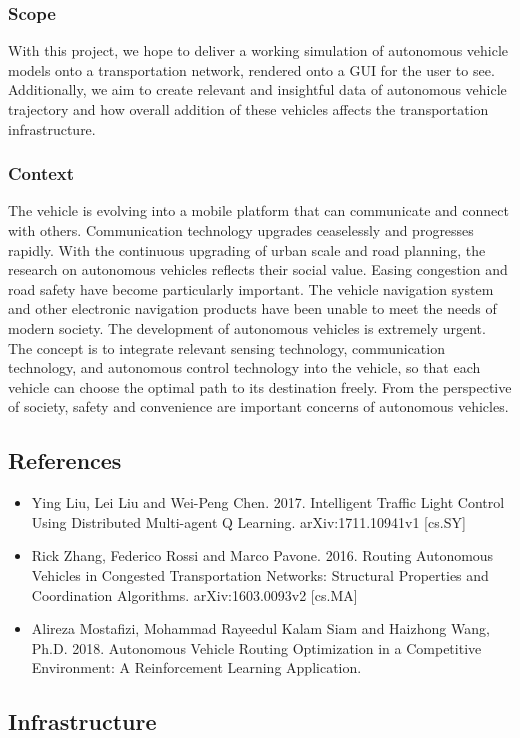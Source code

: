 \documentclass[onecolumn, draftclsnofoot,10pt, compsoc]{IEEEtran}
\begin{document}
\subsubsection{Scope}
With this project, we hope to deliver a working simulation of autonomous vehicle models onto a transportation network, rendered onto a GUI for the user to see.
Additionally, we aim to create relevant and insightful data of autonomous vehicle trajectory and how overall addition of these vehicles affects the transportation infrastructure.
\subsubsection{Context}
The vehicle is evolving into a mobile platform that can communicate and connect with others.
Communication technology upgrades ceaselessly and progresses rapidly.
With the continuous upgrading of urban scale and road planning, the research on autonomous vehicles reflects their social value.
Easing congestion and road safety have become particularly important.
The vehicle navigation system and other electronic navigation products have been unable to meet the needs of modern society.
The development of autonomous vehicles is extremely urgent.
The concept is to integrate relevant sensing technology, communication technology, and autonomous control technology into the vehicle, so that each vehicle can choose the optimal path to its destination freely.
From the perspective of society, safety and convenience are important concerns of autonomous vehicles.
\subsection{References}
\begin{itemize}
\item Ying Liu, Lei Liu and Wei-Peng Chen. 2017. Intelligent Traffic Light Control Using Distributed Multi-agent Q Learning. arXiv:1711.10941v1 [cs.SY]
\item Rick Zhang, Federico Rossi and Marco Pavone. 2016. Routing Autonomous Vehicles in Congested Transportation Networks: Structural Properties and Coordination Algorithms. arXiv:1603.0093v2 [cs.MA]
\item Alireza Mostafizi, Mohammad Rayeedul Kalam Siam and Haizhong Wang, Ph.D. 2018.  Autonomous Vehicle Routing Optimization in a Competitive Environment: A Reinforcement Learning Application.
\end{itemize}
\subsection{Infrastructure}
\end{document}
